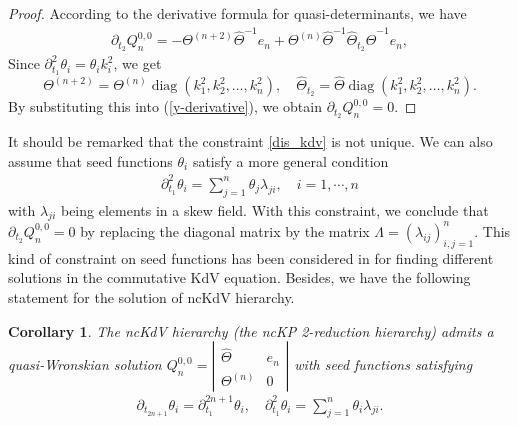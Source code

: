 \documentclass[11p,reqno]{amsart}
\numberwithin{equation}{section}
\newtheorem{coro}[theorem]{Corollary}
\numberwithin{equation}{section}
\begin{document}
\begin{proof}
  According to the derivative formula for quasi-determinants, we have
    \begin{equation} \label{y-derivative}
        \begin{split}
       \partial_{t_2} Q_n^{0,0} = - \Theta^{(n+2)} \widehat{\Theta}^{-1} e_{n} + \Theta^{(n)} \widehat{\Theta}^{-1} \widehat{\Theta}_{t_2} \widehat{\Theta}^{-1} e_{n},
        \end{split}
    \end{equation}
    Since $\partial_{t_1}^2 \theta_i = \theta_i k_i^2$, we get
    \[
        \Theta^{(n+2)} = \Theta^{(n)} \operatorname{diag}(k_1^2, k_2^2, \dots, k_n^2),\quad
    \widehat{\Theta}_{t_2} = \widehat{\Theta} \operatorname{diag}(k_1^2, k_2^2, \dots, k_n^2).    
    \]
   By substituting this into (\ref{y-derivative}), we obtain $\partial_{t_2} Q_n^{0,0} = 0$.
\end{proof}
It should be remarked that the constraint \eqref{dis_kdv} is not unique. We can also assume that seed functions $\theta_i$ satisfy a more general condition
\begin{align*}
\partial_{t_1}^2\theta_i=\sum_{j=1}^n \theta_j\lambda_{ji},\quad i=1,\cdots,n
\end{align*}
with $\lambda_{ji}$ being elements in a skew field. With this constraint, we conclude that $\partial_{t_2} Q_n^{0,0}=0$ by replacing the diagonal matrix by the matrix $\Lambda=(\lambda_{ij})_{i,j=1}^n$. This kind of constraint on seed functions has been considered in \cite{ma05} for finding different solutions in the commutative KdV equation.
Besides, we have the following statement for the solution of ncKdV hierarchy.
\begin{coro}
The ncKdV hierarchy (the ncKP 2-reduction hierarchy) admits a quasi-Wronskian solution $Q_n^{0,0}=\left|
\begin{array}{cc}
    \widehat{\Theta} & e_{n} \\
    \Theta^{(n)} & \boxed{0}
\end{array}
\right|$ with seed functions satisfying 
\begin{align*}
\partial_{t_{2n+1}}\theta_i=\partial_{t_1}^{2n+1}\theta_i,\quad \partial_{t_1}^2\theta_i=\sum_{j=1}^n \theta_i\lambda_{ji}.
\end{align*}
\end{coro}
\end{document}
